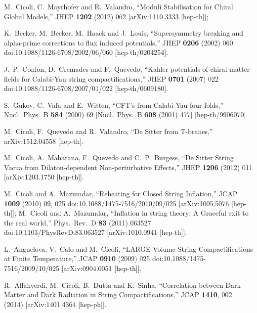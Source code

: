 \documentclass[11pt,a4paper]{article}
\begin{document}
\begin{thebibliography}{99}
M.~Cicoli, C.~Mayrhofer and R.~Valandro,
  ``Moduli Stabilisation for Chiral Global Models,''
  JHEP {\bf 1202} (2012) 062
  [arXiv:1110.3333 [hep-th]];
  	
K.~Becker, M.~Becker, M.~Haack and J.~Louis,
  ``Supersymmetry breaking and alpha-prime corrections to flux induced potentials,''
  JHEP {\bf 0206} (2002) 060
  doi:10.1088/1126-6708/2002/06/060
  [hep-th/0204254].

  J.~P.~Conlon, D.~Cremades and F.~Quevedo,
  ``Kahler potentials of chiral matter fields for Calabi-Yau string compactifications,''
  JHEP {\bf 0701} (2007) 022
  doi:10.1088/1126-6708/2007/01/022
  [hep-th/0609180].

  S.~Gukov, C.~Vafa and E.~Witten,
  ``CFT's from Calabi-Yau four folds,''
  Nucl.\ Phys.\ B {\bf 584} (2000) 69
   [Nucl.\ Phys.\ B {\bf 608} (2001) 477]
  [hep-th/9906070].
  
  M.~Cicoli, F.~Quevedo and R.~Valandro,
  ``De Sitter from T-branes,''
  arXiv:1512.04558 [hep-th].
	
  M.~Cicoli, A.~Maharana, F.~Quevedo and C.~P.~Burgess,
  ``De Sitter String Vacua from Dilaton-dependent Non-perturbative Effects,''
  JHEP {\bf 1206} (2012) 011
  [arXiv:1203.1750 [hep-th]].

  M.~Cicoli and A.~Mazumdar,
  ``Reheating for Closed String Inflation,''
  JCAP {\bf 1009} (2010) 09,  025
  doi:10.1088/1475-7516/2010/09/025
  [arXiv:1005.5076 [hep-th]];
M.~Cicoli and A.~Mazumdar,
  ``Inflation in string theory: A Graceful exit to the real world,''
  Phys.\ Rev.\ D {\bf 83} (2011) 063527
  doi:10.1103/PhysRevD.83.063527
  [arXiv:1010.0941 [hep-th]].

  L.~Anguelova, V.~Calo and M.~Cicoli,
  ``LARGE Volume String Compactifications at Finite Temperature,''
  JCAP {\bf 0910} (2009) 025
  doi:10.1088/1475-7516/2009/10/025
  [arXiv:0904.0051 [hep-th]].

  R.~Allahverdi, M.~Cicoli, B.~Dutta and K.~Sinha,
  ``Correlation between Dark Matter and Dark Radiation in String Compactifications,''
  JCAP {\bf 1410}, 002 (2014)
  [arXiv:1401.4364 [hep-ph]].


\end{thebibliography}
\end{document}
